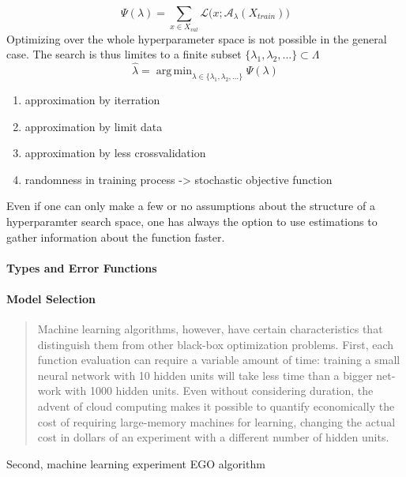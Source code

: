 \documentclass[english]{article}
\DeclareMathOperator*{\argmin}{arg\,min}
\begin{document}
\begin{equation}
  \Psi(\lambda) = \sum_{x \in X_{val}} \mathcal{L}\big(x;\mathcal{A}_\lambda(X_{train})\big)
\end{equation}
Optimizing over the whole hyperparameter space is not possible in the general case. The search is thus limites to a finite subset $\{\lambda_1, \lambda_2, ... \} \subset \Lambda$
\begin{equation}
  \hat{\lambda} = \argmin_{\lambda \in \{\lambda_1, \lambda_2, ... \}} \Psi(\lambda)
\label{empirical hypa_opt_1}
\end{equation}


\begin{enumerate}
  \item approximation by iterration
  \item approximation by limit data
  \item approximation by less crossvalidation
  \item randomness in training process -> stochastic objective function
\end{enumerate}

Even if one can only make a few or no assumptions about the structure of a hyperparamter search space, one has always the option to use estimations to gather information about the function faster.

\paragraph{Types and Error Functions}
\paragraph{Model Selection}



\begin{quote}
Machine learning algorithms, however, have certain characteristics that distinguish them from other black-box optimization problems.  First, each function evaluation can require a variable amount of time:  training a small neural network with 10 hidden units will take less time than a bigger net-work with 1000 hidden units.  Even without considering duration, the advent of cloud computing makes it possible to quantify economically the cost of requiring large-memory machines for learning, changing the actual cost in dollars of an experiment with a different number of hidden units.
\end{quote}
Second, machine learning experiment EGO algorithm
\end{document}
